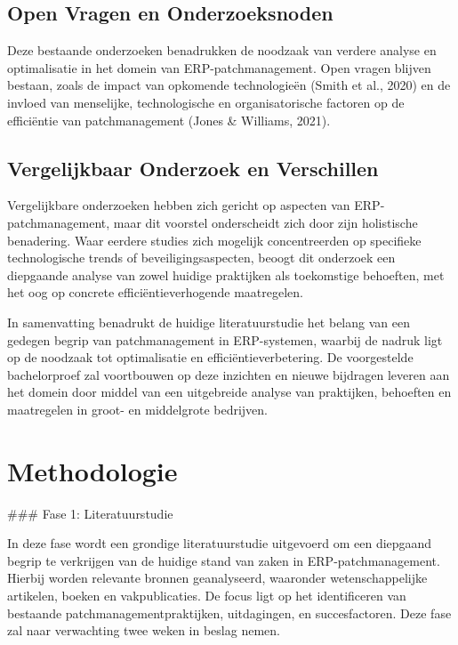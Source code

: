 \subsection{Open Vragen en Onderzoeksnoden}

Deze bestaande onderzoeken benadrukken de noodzaak van verdere analyse en optimalisatie in het domein van ERP-patchmanagement. Open vragen blijven bestaan, zoals de impact van opkomende technologieën (Smith et al., 2020) en de invloed van menselijke, technologische en organisatorische factoren op de efficiëntie van patchmanagement (Jones & Williams, 2021).

\subsection{Vergelijkbaar Onderzoek en Verschillen}

Vergelijkbare onderzoeken hebben zich gericht op aspecten van ERP-patchmanagement, maar dit voorstel onderscheidt zich door zijn holistische benadering. Waar eerdere studies zich mogelijk concentreerden op specifieke technologische trends of beveiligingsaspecten, beoogt dit onderzoek een diepgaande analyse van zowel huidige praktijken als toekomstige behoeften, met het oog op concrete efficiëntieverhogende maatregelen.

In samenvatting benadrukt de huidige literatuurstudie het belang van een gedegen begrip van patchmanagement in ERP-systemen, waarbij de nadruk ligt op de noodzaak tot optimalisatie en efficiëntieverbetering. De voorgestelde bachelorproef zal voortbouwen op deze inzichten en nieuwe bijdragen leveren aan het domein door middel van een uitgebreide analyse van praktijken, behoeften en maatregelen in groot- en middelgrote bedrijven.




\section{Methodologie}%
\label{sec:methodologie}


### Fase 1: Literatuurstudie

In deze fase wordt een grondige literatuurstudie uitgevoerd om een diepgaand begrip te verkrijgen van de huidige stand van zaken in ERP-patchmanagement. Hierbij worden relevante bronnen geanalyseerd, waaronder wetenschappelijke artikelen, boeken en vakpublicaties. De focus ligt op het identificeren van bestaande patchmanagementpraktijken, uitdagingen, en succesfactoren. Deze fase zal naar verwachting twee weken in beslag nemen.


